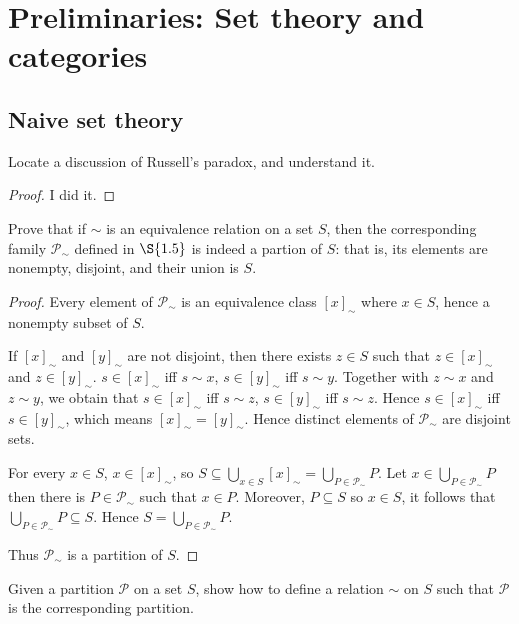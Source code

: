 \chapter{Preliminaries: Set theory and categories}

\section{Naive set theory}

\begin{exercise}{1.1}
	Locate a discussion of Russell's paradox, and understand it.
\end{exercise}

\begin{proof}
	I did it.
\end{proof}

\begin{exercise}{1.2}
	Prove that if $\sim$ is an equivalence relation on a set $S$, then the corresponding family $\mathscr{P}_{\sim}$ defined in $\S{1.5}$ is indeed a partion of $S$: that is, its elements are nonempty, disjoint, and their union is $S$.
\end{exercise}

\begin{proof}
	Every element of $\mathscr{P}_{\sim}$ is an equivalence class ${[x]}_{\sim}$ where $x\in S$, hence a nonempty subset of $S$.

	If ${[x]}_{\sim}$ and ${[y]}_{\sim}$ are not disjoint, then there exists $z\in S$ such that $z \in {[x]}_{\sim}$ and $z \in {[y]}_{\sim}$. $s\in {[x]}_{\sim}$ iff $s \sim x$, $s\in {[y]}_{\sim}$ iff $s \sim y$. Together with $z \sim x$ and $z \sim y$, we obtain that $s\in {[x]}_{\sim}$ iff $s \sim z$, $s\in {[y]}_{\sim}$ iff $s \sim z$. Hence $s\in {[x]}_{\sim}$ iff $s\in {[y]}_{\sim}$, which means ${[x]}_{\sim} = {[y]}_{\sim}$. Hence distinct elements of $\mathscr{P}_{\sim}$ are disjoint sets.

	For every $x\in S$, $x \in {[x]}_{\sim}$, so $S \subseteq \bigcup_{x\in S}{[x]}_{\sim} = \bigcup_{P\in \mathscr{P}_{\sim}}P$. Let $x\in \bigcup_{P\in \mathscr{P}_{\sim}}P$ then there is $P\in \mathscr{P}_{\sim}$ such that $x\in P$. Moreover, $P\subseteq S$ so $x\in S$, it follows that $\bigcup_{P\in \mathscr{P}_{\sim}}P \subseteq S$. Hence $S = \bigcup_{P\in \mathscr{P}_{\sim}}P$.

	Thus $\mathscr{P}_{\sim}$ is a partition of $S$.
\end{proof}

\begin{exercise}{1.3}
	Given a partition $\mathscr{P}$ on a set $S$, show how to define a relation $\sim$ on $S$ such that $\mathscr{P}$ is the corresponding partition.
\end{exercise}

